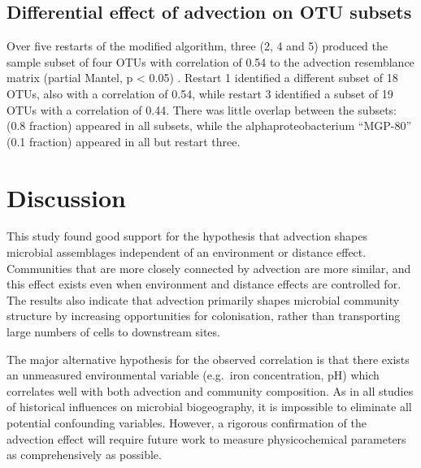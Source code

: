 \subsection{Differential effect of advection on OTU subsets}

Over five restarts of the modified  algorithm, three (2, 4 and 5) produced the sample subset of four \acp{OTU} with correlation of 0.54 to the advection resemblance matrix (partial Mantel, p < 0.05) .
Restart 1 identified a different subset of 18 \acp{OTU}, also with a correlation of 0.54, while restart 3 identified a subset of 19 \acp{OTU} with a correlation of 0.44.
There was little overlap between the subsets:  (0.8 \micron{} fraction) appeared in all subsets, while the alphaproteobacterium ``MGP-80'' (0.1 \micron{} fraction) appeared in all but restart three.



\section{Discussion}

This study found good support for the hypothesis that advection shapes microbial assemblages independent of an environment or distance effect.
Communities that are more closely connected by advection are more similar, and this effect exists even when environment and distance effects are controlled for.
The results also indicate that advection primarily shapes microbial community structure by increasing opportunities for colonisation, rather than transporting large numbers of cells to downstream sites. 

The major alternative hypothesis for the observed correlation is that there exists an unmeasured environmental variable (e.g.\ iron concentration, pH) which correlates well with both advection and community composition.
As in all studies of historical influences on microbial biogeography, it is impossible to eliminate all potential confounding variables.
However, a rigorous confirmation of the advection effect will require future work to measure physicochemical parameters as comprehensively as possible.

